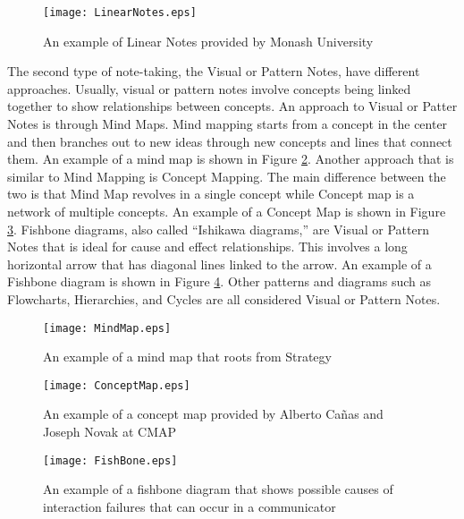 \pagebreak

\begin{figure}[htbp!]
   \centering
   \texttt{[image: LinearNotes.eps]} 
   \caption{An example of Linear Notes provided by Monash University}
   \label{fig:linearnotes}
\end{figure}

The second type of note-taking, the Visual or Pattern Notes, have different approaches. Usually, visual or pattern notes involve concepts being linked together to show relationships between concepts. An approach to Visual or Patter Notes is through Mind Maps. Mind mapping starts from a concept in the center and then branches out to new ideas through new concepts and lines that connect them. An example of a mind map is shown in Figure \ref{fig:mindmap}. Another approach that is similar to Mind Mapping is Concept Mapping. The main difference between the two is that Mind Map revolves in a single concept while Concept map is a network of multiple concepts. An example of a Concept Map is shown in Figure  \ref{fig:conceptmap}. Fishbone diagrams, also called ``Ishikawa diagrams,'' are Visual or Pattern Notes that is ideal for cause and effect relationships. This involves a long horizontal arrow that has diagonal lines linked to the arrow. An example of a Fishbone diagram is shown in Figure \ref{fig:fishbonediagram}. Other patterns and diagrams such as Flowcharts, Hierarchies, and Cycles are all considered Visual or Pattern Notes.

\pagebreak

\begin{figure}[htbp!]          
   \centering                   
   \texttt{[image: MindMap.eps]}  
   \caption{An example of a mind map that roots from Strategy}
   \label{fig:mindmap}
\end{figure}

\begin{figure}[htbp!]          
   \centering                 
   \texttt{[image: ConceptMap.eps]} 
   \caption{An example of a concept map provided by Alberto Cañas and Joseph Novak at CMAP}
   \label{fig:conceptmap}
\end{figure}

\begin{figure}[htbp!]   
   \centering           
   \texttt{[image: FishBone.eps]} 
   \caption{An example of a fishbone diagram that shows possible causes of interaction failures that can occur in a communicator}
   \label{fig:fishbonediagram}
\end{figure}


